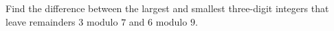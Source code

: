 Find the difference between the largest and smallest three-digit integers that leave remainders $3$ modulo $7$ and $6$ modulo $9$.
